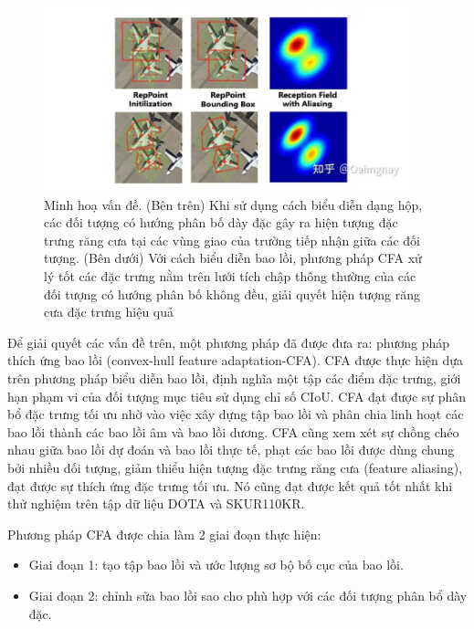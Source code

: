 \documentclass[12pt,a4paper,openany,oneside]{report}
\begin{document}
\begin{figure}[ht!]
	\begin{center}
		\includegraphics[width=400px]{./compare_cfa_with_other.JPG}
		\caption{Minh hoạ vấn đề. (Bên trên) Khi sử dụng cách biểu diễn dạng hộp, các đối tượng có hướng phân bố dày đặc gây ra hiện tượng đặc trưng răng cưa tại các vùng giao của trường tiếp nhận giữa các đối tượng. (Bên dưới) Với cách biểu diễn bao lồi, phương pháp CFA xử lý tốt các đặc trưng nằm trên lưới tích chập thông thường của các đối tượng có hướng phân bố không đều, giải quyết hiện tượng răng cưa đặc trưng hiệu quả}
		\label{fig_dhandang1}
	\end{center}
\end{figure} 


Để giải quyết các vấn đề trên, một phương pháp đã được đưa ra: phương pháp thích ứng bao lồi (convex-hull feature adaptation-CFA). CFA được thực hiện dựa trên phương pháp biểu diễn bao lồi, định nghĩa một tập các điểm đặc trưng, giới hạn phạm vi của đối tượng mục tiêu sử dụng chỉ số CIoU. CFA đạt được sự phân bổ đặc trưng tối ưu nhờ vào việc xây dựng tập bao lồi và phân chia linh hoạt các bao lồi thành các bao lồi âm và bao lồi dương. CFA cũng xem xét sự chồng chéo nhau giữa bao lồi dự đoán và bao lồi thực tế, phạt các bao lồi được dùng chung bởi nhiều đối tượng, giảm thiểu hiện tượng đặc trưng răng cưa (feature aliasing), đạt được sự thích ứng đặc trưng tối ưu. Nó cũng đạt được kết quả tốt nhất khi thử nghiệm trên tập dữ liệu DOTA và SKUR110KR.

Phương pháp CFA được chia làm 2 giai đoạn thực hiện:
\begin{itemize}
	\item Giai đoạn 1: tạo tập bao lồi và ước lượng sơ bộ bố cục của bao lồi.
	\item Giai đoạn 2: chỉnh sửa bao lồi sao cho phù hợp với các đối tượng phân bổ dày đặc.
\end{itemize}
\end{document}
